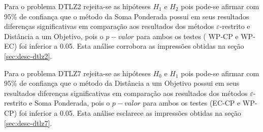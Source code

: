 Para o problema DTLZ2 rejeita-se as hipóteses  $ H_1 $ e $ H_2 $ pois pode-se afirmar com 95\% de confiança que o método da Soma Ponderada possui em seus resultados diferenças significativas em comparação aos resultados dos métodos $ \varepsilon $-restrito e Distância a um Objetivo, pois o $ p-valor $ para ambos os testes ( WP-CP e WP-EC) foi inferior a 0.05. Esta análise corrobora as impressões obtidas na seção \ref{sec:desc-dtlz2}.

Para o problema DTLZ7 rejeita-se as hipóteses  $ H_0 $ e $ H_1 $ pois pode-se afirmar com 95\% de confiança que o método da Distância a um Objetivo  possui em seus resultados diferenças significativas em comparação aos resultados dos métodos $ \varepsilon $-restrito e Soma Ponderada, pois o $ p-valor $ para ambos os testes (EC-CP e WP-CP) foi inferior a 0.05. Esta análise esclarece as impressões obtidas na seção \ref{sec:desc-dtlz7}.






